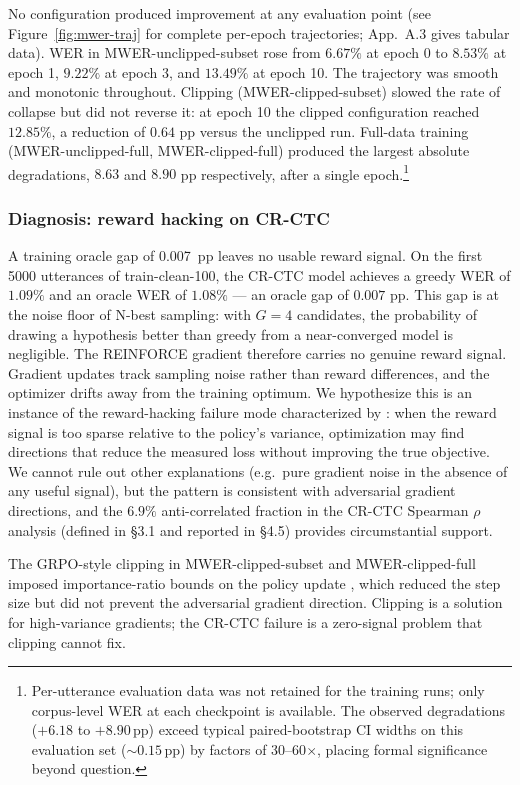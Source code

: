 No configuration produced improvement at any evaluation point (see Figure~\ref{fig:mwer-traj} for complete per-epoch trajectories; App.~A.3 gives tabular data). WER in MWER-unclipped-subset rose from $6.67\%$ at epoch 0 to $8.53\%$ at epoch 1, $9.22\%$ at epoch 3, and $13.49\%$ at epoch 10. The trajectory was smooth and monotonic throughout. Clipping (MWER-clipped-subset) slowed the rate of collapse but did not reverse it: at epoch 10 the clipped configuration reached $12.85\%$, a reduction of $0.64$ pp versus the unclipped run. Full-data training (MWER-unclipped-full, MWER-clipped-full) produced the largest absolute degradations, $8.63$ and $8.90$ pp respectively, after a single epoch.\footnote{Per-utterance evaluation data was not retained for the training
runs; only corpus-level WER at each checkpoint is available. The observed
degradations ($+6.18$ to $+8.90$\,pp) exceed typical paired-bootstrap CI
widths on this evaluation set (${\sim}0.15$\,pp) by factors of 30--60$\times$,
placing formal significance beyond question.}

\subsubsection{Diagnosis: reward hacking on CR-CTC}

A training oracle gap of 0.007~pp leaves no usable reward signal. On the first 5000 utterances of train-clean-100, the CR-CTC model achieves a greedy WER of $1.09\%$ and an oracle WER of $1.08\%$ — an oracle gap of $0.007$ pp. This gap is at the noise floor of N-best sampling: with $G=4$ candidates, the probability of drawing a hypothesis better than greedy from a near-converged model is negligible. The REINFORCE gradient therefore carries no genuine reward signal. Gradient updates track sampling noise rather than reward differences, and the optimizer drifts away from the training optimum. We hypothesize this is an instance of the reward-hacking failure mode characterized by \citet{skalse2022rewardhacking}: when the reward signal is too sparse relative to the policy's variance, optimization may find directions that reduce the measured loss without improving the true objective. We cannot rule out other explanations (e.g.\ pure gradient noise in the absence of any useful signal), but the pattern is consistent with adversarial gradient directions, and the $6.9\%$ anti-correlated fraction in the CR-CTC Spearman $\rho$ analysis (defined in §3.1 and reported in §4.5) provides circumstantial support.

The GRPO-style clipping in MWER-clipped-subset and MWER-clipped-full imposed importance-ratio bounds on the policy update \cite{shao2024grpo}, which reduced the step size but did not prevent the adversarial gradient direction. Clipping is a solution for high-variance gradients; the CR-CTC failure is a zero-signal problem that clipping cannot fix.




